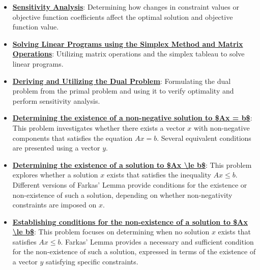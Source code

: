 \documentclass{article}%
\begin{document}
\begin{itemize}[leftmargin=*]%
\item \href{https://www.math.purdue.edu/~yipn/421//2024-10-01-SensitivityDuality.pdf#page=7}{\textbf{Sensitivity Analysis}}: Determining how changes in constraint values or objective function coefficients affect the optimal solution and objective function value.%
\item \href{https://www.math.purdue.edu/~yipn/421//2024-10-01-SensitivityDuality.pdf#page=4}{\textbf{Solving Linear Programs using the Simplex Method and Matrix Operations}}: Utilizing matrix operations and the simplex tableau to solve linear programs.%
\item \href{https://www.math.purdue.edu/~yipn/421//2024-10-01-SensitivityDuality.pdf#page=2}{\textbf{Deriving and Utilizing the Dual Problem}}: Formulating the dual problem from the primal problem and using it to verify optimality and perform sensitivity analysis.%
\end{itemize}%
\begin{itemize}[leftmargin=*]%
\item \href{https://www.math.purdue.edu/~yipn/421//2024-10-28-Farkas.pdf#page=2}{\textbf{Determining the existence of a non{-}negative solution to \$Ax = b\$}}: This problem investigates whether there exists a vector $x$ with non-negative components that satisfies the equation $Ax = b$. Several equivalent conditions are presented using a vector $y$.%
\item \href{https://www.math.purdue.edu/~yipn/421//2024-10-28-Farkas.pdf#page=4}{\textbf{Determining the existence of a solution to \$Ax \textbackslash{}le b\$}}: This problem explores whether a solution $x$ exists that satisfies the inequality $Ax \le b$.  Different versions of Farkas' Lemma provide conditions for the existence or non-existence of such a solution, depending on whether non-negativity constraints are imposed on $x$.%
\item \href{https://www.math.purdue.edu/~yipn/421//2024-10-28-Farkas.pdf#page=6}{\textbf{Establishing conditions for the non{-}existence of a solution to \$Ax \textbackslash{}le b\$}}: This problem focuses on determining when no solution $x$ exists that satisfies $Ax \le b$.  Farkas' Lemma provides a necessary and sufficient condition for the non-existence of such a solution, expressed in terms of the existence of a vector $y$ satisfying specific constraints.%
\end{itemize}%
\end{document}
